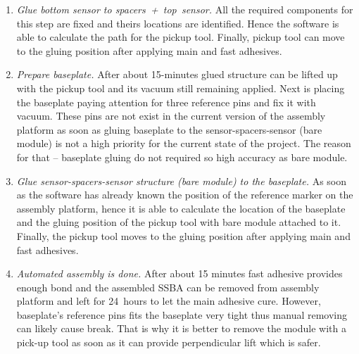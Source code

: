 \begin{enumerate}
\item \emph{Glue bottom sensor to spacers~+~top~sensor.} All the required components for this step are fixed and theirs locations are identified. Hence the software is able to calculate the path for the pickup tool. Finally, pickup tool can move to the gluing position after applying main and fast adhesives.
\item \emph{Prepare baseplate.} After about 15-minutes glued structure can be lifted up with the pickup tool and its vacuum still remaining applied. Next is placing the baseplate paying attention for three reference pins and fix it with vacuum. These pins are not exist in the current version of the assembly platform as soon as gluing baseplate to the sensor-spacers-sensor (bare module) is not a high priority for the current state of the project. The reason for that -- baseplate gluing do not required so high accuracy as bare module.
\item \emph{Glue sensor-spacers-sensor structure (bare module) to the baseplate.} As soon as the software has already known the position of the reference marker on the assembly platform, hence it is able to calculate the location of the baseplate and the gluing position of the pickup tool with bare module attached to it. Finally, the pickup tool moves to the gluing position after applying main and fast adhesives.
\item \emph{Automated assembly is done.} After about 15 minutes fast adhesive provides enough bond and the assembled SSBA can be removed from assembly platform and left for 24~hours to let the main adhesive cure. However, baseplate's reference pins fits the baseplate very tight thus manual removing can likely cause break. That is why it is better to remove the module with a pick-up tool as soon as it can provide perpendicular lift which is safer.
\end{enumerate}
